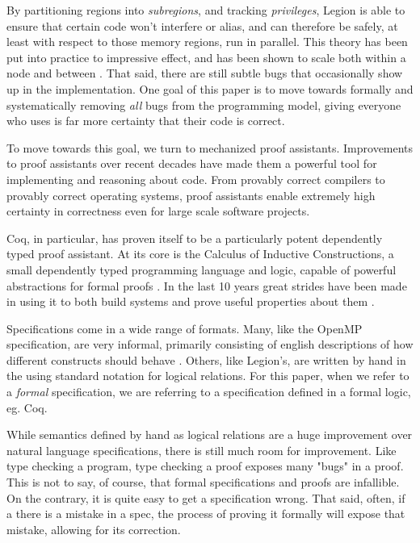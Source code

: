 \documentclass[sigconf]{acmart}
\begin{document}
By partitioning regions into \emph{subregions}, and tracking \emph{privileges},
Legion is able to ensure that certain code won't interfere or alias, and can
therefore be safely, at least with respect to those memory regions, run in
parallel. This theory has been put into practice to impressive effect, and has
been shown to scale both within a node and between \cite{bauer2012legion,
treichler2014realm}. That said, there are still subtle bugs that occasionally
show up in the implementation. One goal of this paper is to move towards
formally and systematically removing \emph{all} bugs from the programming
model, giving everyone who uses is far more certainty that their code is
correct.

To move towards this goal, we turn to mechanized proof assistants.
Improvements to proof assistants over recent decades have made them a powerful
tool for implementing and reasoning about code. From provably correct compilers
to provably correct operating systems, proof assistants enable extremely high
certainty in correctness even for large scale software projects. 

Coq, in particular, has proven itself to be a particularly potent dependently
typed proof assistant. At its core is the Calculus of Inductive Constructions,
a small dependently typed programming language and logic, capable of powerful
abstractions for formal proofs \cite{bertot2013interactive}. In the last 10
years great strides have been made in using it to both build systems and prove
useful properties about them \cite{leroy2012compcert, anand2017certicoq,
chlipala2009effective}. 

Specifications come in a wide range of formats. Many, like the OpenMP
specification, are very informal, primarily consisting of english descriptions
of how different constructs should behave \cite{dagum1998openmp}. Others, like
Legion's, are written by hand in the using standard notation for logical
relations. For this paper, when we refer to a \emph{formal} specification, we
are referring to a specification defined in a formal logic, eg. Coq. 

While semantics defined by hand as logical relations are a huge improvement
over natural language specifications, there is still much room for improvement.
Like type checking a program, type checking a proof exposes many "bugs" in a
proof. This is not to say, of course, that formal specifications and proofs are
infallible. On the contrary, it is quite easy to get a specification wrong.
That said, often, if a there is a mistake in a spec, the process of proving it
formally will expose that mistake, allowing for its correction.  
\end{document}
